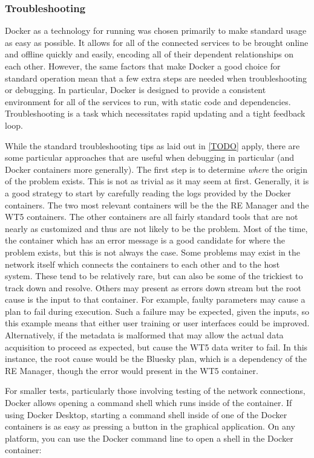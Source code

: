 \subsubsection{Troubleshooting}

Docker as a technology for running \biab was chosen primarily to make standard usage as easy as possible.
It allows for all of the connected services to be brought online and offline quickly and easily, encoding all of their dependent relationships on each other.
However, the same factors that make Docker a good choice for standard operation mean that a few extra steps are needed when troubleshooting or debugging.
In particular, Docker is designed to provide a consistent environment for all of the services to run, with static code and dependencies.
Troubleshooting is a task which necessitates rapid updating and a tight feedback loop.

While the standard troubleshooting tips as laid out in \ref{TODO} apply, there are some particular approaches that are useful when debugging \biab in particular (and Docker containers more generally).
The first step is to determine \textit{where} the origin of the problem exists.
This is not as trivial as it may seem at first.
Generally, it is a good strategy to start by carefully reading the logs provided by the Docker containers.
The two most relevant containers will be the the RE Manager and the WT5 containers.
The other containers are all fairly standard tools that are not nearly as customized and thus are not likely to be the problem.
Most of the time, the container which has an error message is a good candidate for where the problem exists, but this is not always the case.
Some problems may exist in the network itself which connects the containers to each other and to the host system.
These tend to be relatively rare, but can also be some of the trickiest to track down and resolve.
Others may present as errors down stream but the root cause is the input to that container.
For example, faulty parameters may cause a plan to fail during execution.
Such a failure may be expected, given the inputs, so this example means that either user training or user interfaces could be improved.
Alternatively, if the metadata is malformed that may allow the actual data acquisition to proceed as expected, but cause the WT5 data writer to fail.
In this instance, the root cause would be the Bluesky plan, which is a dependency of the RE Manager, though the error would present in the WT5 container.


For smaller tests, particularly those involving testing of the network connections, Docker allows opening a command shell which runs inside of the container.
If using Docker Desktop, starting a command shell inside of one of the Docker containers is as easy as pressing a button in the graphical application.
On any platform, you can use the Docker command line to open a shell in the Docker container:

